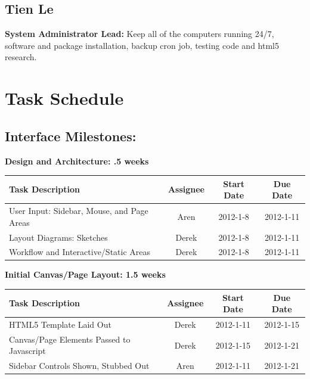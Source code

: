\documentclass[12pt, letterpaper]{article}
\begin{document}
  \subsection{Tien Le}
  {\bf System Administrator Lead:} Keep all of the computers running 24/7, software and package installation, backup cron job, testing code and html5 research. 

\section{Task Schedule}
	\subsection{Interface Milestones:}

  \begin{center}
		{\bf Design and Architecture: .5 weeks}
    \begin{tabular}{| p{8.3cm} || c | c | c | }
      \hline
      Task Description & Assignee & Start Date & Due Date \\
      \hline
	    User Input: Sidebar, Mouse, and Page Areas & Aren & 2012-1-8 & 2012-1-11 \\
	    Layout Diagrams: Sketches & Derek & 2012-1-8 & 2012-1-11 \\
	    Workflow and Interactive/Static Areas & Derek & 2012-1-8 & 2012-1-11 \\
      \hline
    \end{tabular}
  \end{center}

  \begin{center}
		{\bf Initial Canvas/Page Layout: 1.5 weeks}
    \begin{tabular}{| p{8.3cm} || c | c | c | }
      \hline
      Task Description & Assignee & Start Date & Due Date \\
      \hline
	    HTML5 Template Laid Out & Derek & 2012-1-11 & 2012-1-15 \\
	    Canvas/Page Elements Passed to Javascript & Derek & 2012-1-15 & 2012-1-21 \\
	    Sidebar Controls Shown, Stubbed Out & Aren & 2012-1-11 & 2012-1-21 \\
      \hline
    \end{tabular}
  \end{center}
\end{document}

